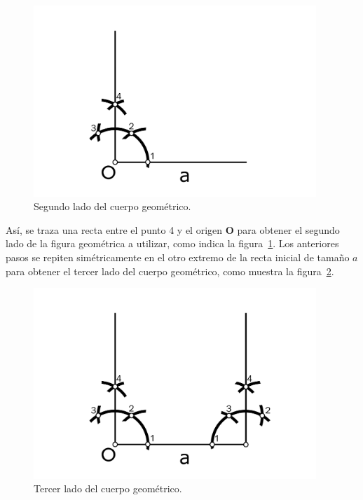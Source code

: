 \begin{figure}[H]
\centering
\includegraphics[width=0.95\textwidth]{Figures/Cuad6}
\caption[Segundo lado del cuerpo geométrico.]{Segundo lado del cuerpo geométrico.}
\label{fig:TrazFig6}
\end{figure}

Así, se traza una recta entre el punto 4 y el origen \textbf{O} para obtener el segundo lado de la figura geométrica a utilizar, como indica la figura~\ref{fig:TrazFig6}. Los anteriores pasos se repiten simétricamente en el otro extremo de la recta inicial de tamaño $a$ para obtener el tercer lado del cuerpo geométrico, como muestra la figura~\ref{fig:TrazFig7}.

\begin{figure}[H]
\centering
\includegraphics[width=0.95\textwidth]{Figures/Cuad7}
\caption[Tercer lado del cuerpo geométrico.]{Tercer lado del cuerpo geométrico.}
\label{fig:TrazFig7}
\end{figure}

